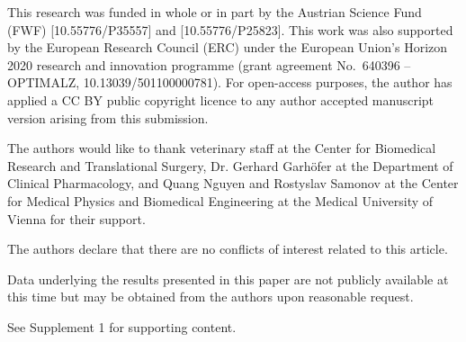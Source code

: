 \documentclass{optica-article}
\begin{document}
\begin{backmatter}
\noindent This research was funded in whole or in part by the Austrian Science Fund (FWF) [10.55776/P35557] and [10.55776/P25823]. 
This work was also supported by the European Research Council (ERC) under the European Union's Horizon 2020 research and innovation programme (grant agreement No.\ 640396 -- OPTIMALZ, 10.13039/501100000781). For open-access purposes, the author has applied a CC BY public copyright licence to any author accepted manuscript version arising from this submission.

\noindent The authors would like to thank veterinary staff at the Center for Biomedical Research and Translational Surgery, Dr. Gerhard Garh\"ofer at the Department of Clinical Pharmacology, and Quang Nguyen and Rostyslav Samonov at the Center for Medical Physics and Biomedical Engineering at the Medical University of Vienna for their support.

\noindent The authors declare that there are no conflicts of interest related to this article.

\noindent Data underlying the results presented in this paper are not publicly available at this time but may be obtained from the authors upon reasonable request.

\noindent See Supplement 1 for supporting content.

\end{backmatter}


\end{document}
